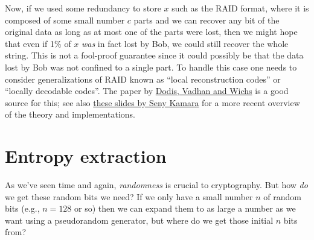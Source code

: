Now, if we used some redundancy to store \(x\) such as the RAID format,
where it is composed of some small number \(c\) parts and we can recover
any bit of the original data as long as at most one of the parts were
lost, then we might hope that even if 1\% of \(x\) \emph{was} in fact
lost by Bob, we could still recover the whole string. This is not a
fool-proof guarantee since it could possibly be that the data lost by
Bob was not confined to a single part. To handle this case one needs to
consider generalizations of RAID known as ``local reconstruction codes''
or ``locally decodable codes''. The paper by
\href{http://www.people.seas.harvard.edu/~salil/research/PoR-tcc09.pdf}{Dodis,
Vadhan and Wichs} is a good source for this; see also
\href{http://research.microsoft.com/en-us/um/people/senyk/slides/pos-cai.pdf}{these
slides by Seny Kamara} for a more recent overview of the theory and
implementations.

\section{Entropy extraction}\label{8-Entropy-extraction}

As we've seen time and again, \emph{randomness} is crucial to
cryptography. But how \emph{do} we get these random bits we need? If we
only have a small number \(n\) of random bits (e.g., \(n=128\) or so)
then we can expand them to as large a number as we want using a
pseudorandom generator, but where do we get those initial \(n\) bits
from?

